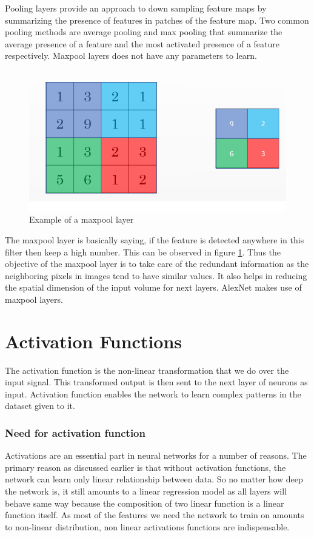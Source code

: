 \documentclass[11pt]{report}
\begin{document}
Pooling layers provide an approach to down sampling feature maps by summarizing the presence of features in patches of the feature map. Two common pooling methods are average pooling and max pooling that summarize the average presence of a feature and the most activated presence of a feature respectively. Maxpool layers does not have any parameters to learn.

\begin{figure}[!h]
	\includegraphics[scale=0.32]{maxpool.png}
	\centering 
	\caption{Example of a maxpool layer}
	\label{maxpoolex}
\end{figure}

The maxpool layer is basically saying, if the feature is detected anywhere in this filter then keep a high number. This can be observed in figure \ref{maxpoolex}. Thus the objective of the maxpool layer is to take care of the redundant information as the neighboring pixels in images tend to have similar values. It also helps in reducing the spatial dimension of the input volume for next layers. AlexNet makes use of maxpool layers.

\section{Activation Functions}
The activation function is the non-linear transformation that we do over the input signal. This transformed output is then sent to the next layer of neurons as input. Activation function enables the network to learn complex patterns in the dataset given to it.
\subsubsection{Need for activation function}
Activations are an essential part in neural networks for a number of reasons. The primary reason as discussed earlier is that without activation functions, the network can learn only linear relationship between data. So no matter how deep the network is, it still amounts to a linear regression model as all layers will behave same way because the composition of two linear function is a linear function itself. As most of the features we need the network to train on amounts to non-linear distribution, non linear activations functions are indispensable. 
\end{document}
